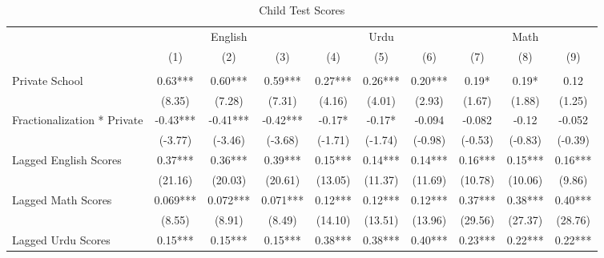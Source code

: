 \begin{sidewaystable}[htbp]\centering
\def\sym#1{\ifmmode^{#1}\else\(^{#1}\)\fi}
\caption{Child Test Scores\label{kids}}
\begin{tabular}{l*{9}{c}}
\toprule
                &\multicolumn{3}{c}{English}           &\multicolumn{3}{c}{Urdu}              &\multicolumn{3}{c}{Math}              \\\cmidrule(lr){2-4}\cmidrule(lr){5-7}\cmidrule(lr){8-10}
                &\multicolumn{1}{c}{(1)}&\multicolumn{1}{c}{(2)}&\multicolumn{1}{c}{(3)}&\multicolumn{1}{c}{(4)}&\multicolumn{1}{c}{(5)}&\multicolumn{1}{c}{(6)}&\multicolumn{1}{c}{(7)}&\multicolumn{1}{c}{(8)}&\multicolumn{1}{c}{(9)}\\
                &\multicolumn{1}{c}{}&\multicolumn{1}{c}{}&\multicolumn{1}{c}{}&\multicolumn{1}{c}{}&\multicolumn{1}{c}{}&\multicolumn{1}{c}{}&\multicolumn{1}{c}{}&\multicolumn{1}{c}{}&\multicolumn{1}{c}{}\\
\midrule
Private School  &     0.63***&     0.60***&     0.59***&     0.27***&     0.26***&     0.20***&     0.19*  &     0.19*  &     0.12   \\
                &   (8.35)   &   (7.28)   &   (7.31)   &   (4.16)   &   (4.01)   &   (2.93)   &   (1.67)   &   (1.88)   &   (1.25)   \\
Fractionalization * Private&    -0.43***&    -0.41***&    -0.42***&    -0.17*  &    -0.17*  &   -0.094   &   -0.082   &    -0.12   &   -0.052   \\
                &  (-3.77)   &  (-3.46)   &  (-3.68)   &  (-1.71)   &  (-1.74)   &  (-0.98)   &  (-0.53)   &  (-0.83)   &  (-0.39)   \\
Lagged English Scores&     0.37***&     0.36***&     0.39***&     0.15***&     0.14***&     0.14***&     0.16***&     0.15***&     0.16***\\
                &  (21.16)   &  (20.03)   &  (20.61)   &  (13.05)   &  (11.37)   &  (11.69)   &  (10.78)   &  (10.06)   &   (9.86)   \\
Lagged Math Scores&    0.069***&    0.072***&    0.071***&     0.12***&     0.12***&     0.12***&     0.37***&     0.38***&     0.40***\\
                &   (8.55)   &   (8.91)   &   (8.49)   &  (14.10)   &  (13.51)   &  (13.96)   &  (29.56)   &  (27.37)   &  (28.76)   \\
Lagged Urdu Scores&     0.15***&     0.15***&     0.15***&     0.38***&     0.38***&     0.40***&     0.23***&     0.22***&     0.22***\\

\end{tabular}
\end{sidewaystable}
